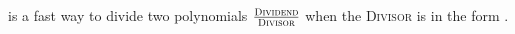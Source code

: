   is a fast way to 
divide two polynomials
$ \frac{\text{\scshape Dividend}}{\text{\scshape Divisor}} $
when the {\scshape Divisor} is in the form .
